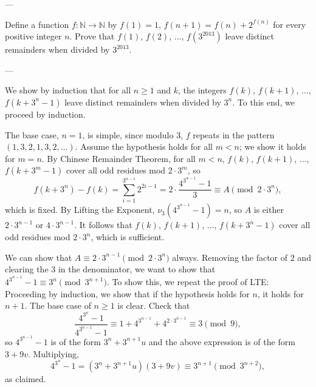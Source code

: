 
---

Define a function $f:\mathbb N\to\mathbb N$ by $f(1)=1$, $f(n+1)=f(n)+2^{f(n)}$ for every positive integer $n$. Prove that $f(1)$, $f(2)$, $\ldots$, $f(3^{2013})$ leave distinct remainders when divided by $3^{2013}$.

---

We show by induction that for all $n\ge1$ and $k$, the integers $f(k)$, $f(k+1)$, $\ldots$, $f(k+3^n-1)$ leave distinct remainders when divided by $3^n$. To this end, we proceed by induction.

The base case, $n=1$, is simple, since modulo $3$, $f$ repeats in the pattern $(1,3,2,1,3,2,\ldots)$. Assume the hypothesis holds for all $m<n$; we show it holds for $m=n$. By Chinese Remainder Theorem, for all $m<n$, $f(k)$, $f(k+1)$, $\ldots$, $f(k+3^m-1)$ cover all odd residues mod $2\cdot3^m$, so \[f(k+3^n)-f(k)=\sum_{i=1}^{3^{n-1}}2^{2i-1}=2\cdot\frac{4^{3^{n-1}}-1}3\equiv A\pmod{2\cdot 3^n},\]
which is fixed. By Lifting the Exponent, $\nu_3(4^{3^{n-1}}-1)=n$, so $A$ is either $2\cdot3^{n-1}$ or $4\cdot3^{n-1}$. It follows that $f(k)$, $f(k+1)$, $\ldots$, $f(k+3^n-1)$ cover all odd residues mod $2\cdot3^n$, which is sufficient.
\begin{boxremark}
    We can show that $A\equiv2\cdot3^{n-1}\pmod{2\cdot3^n}$ always. Removing the factor of $2$ and clearing the $3$ in the denominator, we want to show that $4^{3^{n-1}}-1\equiv3^n\pmod{3^{n+1}}$. To show this, we repeat the proof of LTE: Proceeding by induction, we show that if the hypothesis holds for $n$, it holds for $n+1$. The base case of $n\ge1$ is clear. Check that \[\frac{4^{3^n}-1}{4^{3^{n-1}}-1}\equiv 1+4^{3^{n-1}}+4^{2\cdot3^{n-1}}\equiv3\pmod9,\]
    so $4^{3^{n-1}}-1$ is of the form $3^n+3^{n+1}u$ and the above expression is of the form $3+9v$. Multiplying, \[4^{3^n}-1=(3^n+3^{n+1}u)(3+9v)\equiv3^{n+1}\pmod{3^{n+2}},\]
    as claimed.
\end{boxremark}
